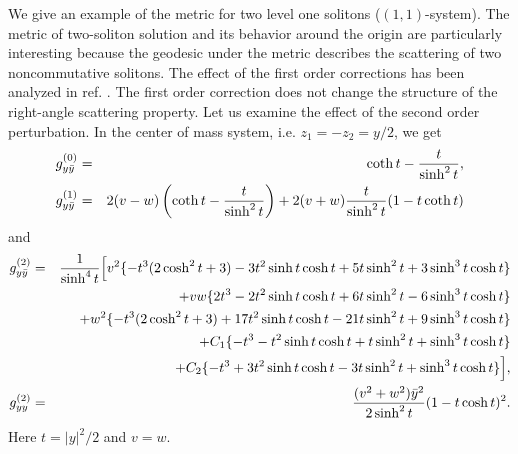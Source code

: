 \documentclass[a4paper,12pt]{article}
\begin{document}
We give an example of the metric for two level one solitons
($(1,1)$-system).
The metric  of two-soliton solution and its behavior
around the origin are particularly interesting because the geodesic
under the metric describes the scattering of two noncommutative
solitons.
The effect of the first order corrections has been analyzed in
ref. \cite{HLRU}.
The first order correction does not change the structure of the
right-angle scattering property.
Let us examine the effect of the second order perturbation.
In  the center of mass system, i.e.
$z_{1}=-z_{2}=y/2$, we get
\begin{eqnarray}
 g^{(0)}_{y\bar{y}}
&=&
\coth t -{t\over \sinh^2 t},
\\
g^{(1)}_{y\bar{y}}&=&
2(v-w)\left(
\coth t -{t\over \sinh^2 t}
\right)
+2(v+w) {t\over \sinh^2 t} (1-t \coth t)
\end{eqnarray}
and
\begin{eqnarray}
g^{(2)}_{y\bar{y}}&=&
{1\over \sinh^4 t}
\Bigl[
v^2\{
-t^3(2\cosh^2 t+3) -3t^2\sinh t\cosh t+5t \sinh^2 t+3\sinh^3 t\cosh t
\}\nonumber\\
&& +vw \{
2t^3 -2t^2 \sinh t\cosh t +6 t\sinh^2 t-6\sinh^3 t\cosh t
\} \nonumber\\
&& +w^2\{
-t^3(2\cosh^2 t+3) +17 t^2\sinh t\cosh t-21t\sinh^2 t+9\sinh^3 t\cosh t
\}\nonumber\\
&& +C_{1} \{
-t^3-t^2\sinh t\cosh t +t\sinh^2 t+\sinh^3 t\cosh t
\}\nonumber\\
&&+C_{2} \{
-t^3+3t^2\sinh t\cosh t-3 t \sinh^2 t+\sinh^3 t\cosh t
\}
\Bigr],
\\
g^{(2)}_{yy}&=& {(v^2+w^2)\bar{y}^2\over 2\sinh^2 t} (1-t\cosh t)^2.
\end{eqnarray}
Here $t=|y|^2/2$ and $v=w$.
\end{document}
